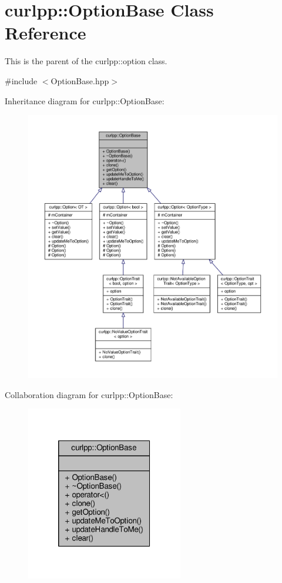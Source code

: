\hypertarget{classcurlpp_1_1OptionBase}{\section{curlpp\-:\-:Option\-Base Class Reference}
\label{classcurlpp_1_1OptionBase}
}


This is the parent of the curlpp\-::option class.  




{\ttfamily \#include $<$Option\-Base.\-hpp$>$}



Inheritance diagram for curlpp\-:\-:Option\-Base\-:
\nopagebreak
\begin{figure}[H]
\begin{center}
\leavevmode
\includegraphics[width=350pt]{classcurlpp_1_1OptionBase__inherit__graph}
\end{center}
\end{figure}


Collaboration diagram for curlpp\-:\-:Option\-Base\-:
\nopagebreak
\begin{figure}[H]
\begin{center}
\leavevmode
\includegraphics[width=194pt]{classcurlpp_1_1OptionBase__coll__graph}
\end{center}
\end{figure}
